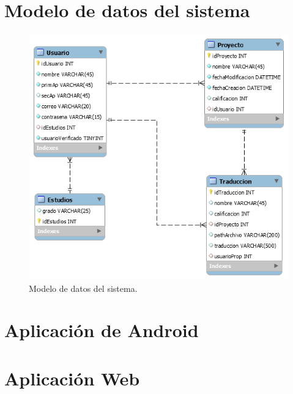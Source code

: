 \section{Modelo de datos del sistema}
\begin{figure}[h]
	\centering
	\includegraphics[width=\textwidth]{capitulo4/imagenes/db.png}
	\caption{Modelo de datos del sistema.}
	\label{fig:db}
\end{figure}


\section{Aplicación de Android}

\newpage
\section{Aplicación Web}

\newpage

\newpage

